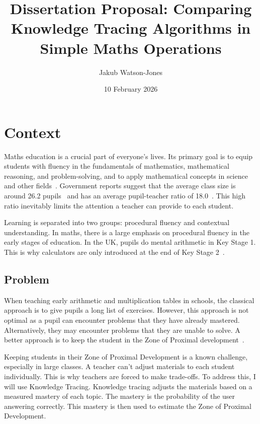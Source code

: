 \documentclass[11pt]{article}
\title{Dissertation Proposal: Comparing Knowledge Tracing Algorithms in Simple Maths Operations}
\author{Jakub Watson-Jones}
\date{10 February 2026}
\begin{document}
 \maketitle

\section{Context}

Maths education is a crucial part of everyone's lives. Its primary goal is to equip students with fluency in the fundamentals of mathematics, mathematical reasoning, and problem-solving, and to apply mathematical concepts in science and other fields~\autocite{Math_Curriculum_England}. Government reports suggest that the average class size is around 26.2 pupils~\autocite{Class_Size_England} and has an average pupil-teacher ratio of 18.0~\autocite{Pupil_Teacher_Ratio_England}. This high ratio inevitably limits the attention a teacher can provide to each student.

Learning is separated into two groups: procedural fluency and contextual understanding. In maths, there is a large emphasis on procedural fluency in the early stages of education. In the UK, pupils do mental arithmetic in Key Stage 1. This is why calculators are only introduced at the end of Key Stage 2~\autocite{Math_Curriculum_England}.

\subsection{Problem}

When teaching early arithmetic and multiplication tables in schools, the classical approach is to give pupils a long list of exercises. However, this approach is not optimal as a pupil can encounter problems that they have already mastered. Alternatively, they may encounter problems that they are unable to solve. A better approach is to keep the student in the Zone of Proximal development~\autocite{Zone_of_Proximal_Development}.

Keeping students in their Zone of Proximal Development is a known challenge, especially in large classes. A teacher can't adjust materials to each student individually. This is why teachers are forced to make trade-offs. To address this, I will use Knowledge Tracing. Knowledge tracing adjusts the materials based on a measured mastery of each topic. The mastery is the probability of the user answering correctly. This mastery is then used to estimate the Zone of Proximal Development.
\end{document}
